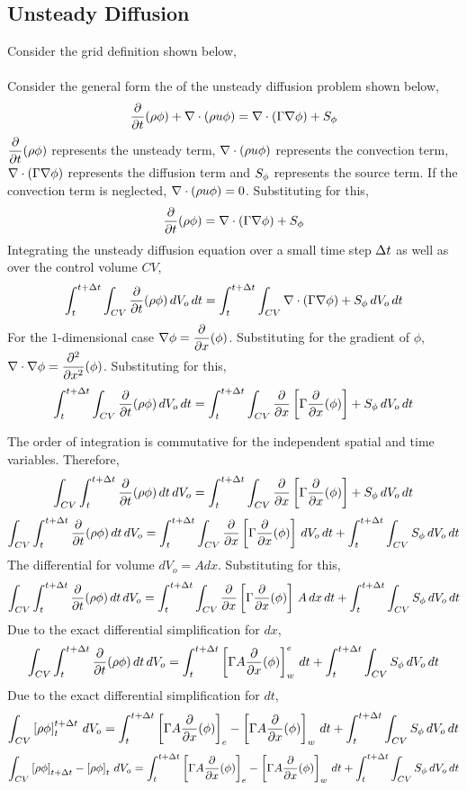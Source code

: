 \documentclass[a4paper, 12pt]{report}
\begin{document}
\begin{center}
\section{Unsteady Diffusion}
\begin{comment}
\end{comment}
Consider the grid definition shown below,
\\~\\Consider the general form the of the unsteady diffusion problem shown below,
$$\frac{\partial}{\partial t}(\rho \phi) + \nabla\cdot(\rho u \phi) = \nabla\cdot(\Gamma \nabla\phi) + S_\phi$$
$\displaystyle{\frac{\partial}{\partial t}(\rho \phi)}$ represents the unsteady term, $\displaystyle{\nabla\cdot(\rho u \phi)}$ represents the convection term, $\displaystyle{\nabla\cdot(\Gamma \nabla\phi)}$ represents the diffusion term and $\displaystyle{S_\phi}$ represents the source term. If the convection term is neglected, $\displaystyle{\nabla\cdot(\rho u \phi)=0}$. Substituting for this,
$$\frac{\partial}{\partial t}(\rho \phi) = \nabla\cdot(\Gamma \nabla\phi) + S_\phi$$
Integrating the unsteady diffusion equation over a small time step $\displaystyle{\Delta t}$ as well as over the control volume $CV$,
$$\int^{t+\Delta t}_{t}\int_{CV}\frac{\partial}{\partial t}(\rho \phi)\,dV_o\,dt = \int^{t+\Delta t}_{t}\int_{CV}\nabla\cdot(\Gamma \nabla\phi) + S_\phi\,dV_o\,dt$$
For the $1$-dimensional case $\displaystyle{\nabla\phi} = \frac{\partial}{\partial x}(\phi)$. Substituting for the gradient of $\phi$, $\displaystyle{\nabla\cdot\nabla\phi = \frac{\partial^2}{\partial x^2}(\phi)}$. Substituting for this,
$$\int^{t+\Delta t}_{t}\int_{CV}\frac{\partial}{\partial t}(\rho \phi)\,dV_o\,dt = \int^{t+\Delta t}_{t}\int_{CV}\frac{\partial}{\partial x}\left[\Gamma \frac{\partial}{\partial x}(\phi)\right] + S_\phi\,dV_o\,dt$$

The order of integration is commutative for the independent spatial and time variables. Therefore,
$$\int_{CV}\int^{t+\Delta t}_{t}\frac{\partial}{\partial t}(\rho \phi)\,dt\,dV_o = \int^{t+\Delta t}_{t}\int_{CV}\frac{\partial}{\partial x}\left[\Gamma \frac{\partial}{\partial x}(\phi)\right] + S_\phi\,dV_o\,dt$$
$$\int_{CV}\int^{t+\Delta t}_{t}\frac{\partial}{\partial t}(\rho \phi)\,dt\,dV_o = \int^{t+\Delta t}_{t}\int_{CV}\frac{\partial}{\partial x}\left[\Gamma \frac{\partial}{\partial x}(\phi)\right]\,dV_o\,dt + \int^{t+\Delta t}_{t}\int_{CV}S_\phi\,dV_o\,dt$$
The differential for volume $dV_o = A dx$. Substituting for this,
$$\int_{CV}\int^{t+\Delta t}_{t}\frac{\partial}{\partial t}(\rho \phi)\,dt\,dV_o = \int^{t+\Delta t}_{t}\int_{CV}\frac{\partial}{\partial x}\left[\Gamma \frac{\partial}{\partial x}(\phi)\right]\,A\,dx\,dt + \int^{t+\Delta t}_{t}\int_{CV}S_\phi\,dV_o\,dt$$
Due to the exact differential simplification for $dx$,
$$\int_{CV}\int^{t+\Delta t}_{t}\frac{\partial}{\partial t}(\rho \phi)\,dt\,dV_o = \int^{t+\Delta t}_{t}\left[\Gamma A\frac{\partial}{\partial x}(\phi)\right]^{e}_{w}\,dt + \int^{t+\Delta t}_{t}\int_{CV}S_\phi\,dV_o\,dt$$
Due to the exact differential simplification for $dt$,
$$\int_{CV}\left[\rho \phi\right]^{t+\Delta t}_{t}\,dV_o = \int^{t+\Delta t}_{t}\left[\Gamma A\frac{\partial}{\partial x}(\phi)\right]_{e} - \left[\Gamma A\frac{\partial}{\partial x}(\phi)\right]_{w}\,dt + \int^{t+\Delta t}_{t}\int_{CV}S_\phi\,dV_o\,dt$$
$$\int_{CV}\left[\rho \phi\right]_{t+\Delta t} - \left[\rho \phi\right]_{t}\,dV_o = \int^{t+\Delta t}_{t}\left[\Gamma A\frac{\partial}{\partial x}(\phi)\right]_{e} - \left[\Gamma A\frac{\partial}{\partial x}(\phi)\right]_{w}\,dt + \int^{t+\Delta t}_{t}\int_{CV}S_\phi\,dV_o\,dt$$


\end{center}
\end{document}
